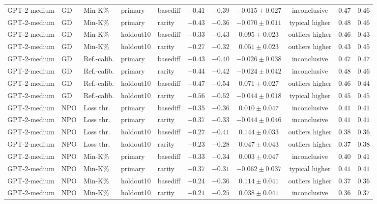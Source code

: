 {\begin{longtable}{@{\extracolsep{\fill}}lllllcccccc@{}}
GPT-2-medium & GD & Min-K\% & primary & basediff & $-0.41$ & $-0.39$ & $-0.015 \pm 0.027$ & inconclusive & $0.47$ & $0.46$ \\
GPT-2-medium & GD & Min-K\% & primary & rarity & $-0.43$ & $-0.36$ & $-0.070 \pm 0.011$ & typical higher & $0.48$ & $0.46$ \\
GPT-2-medium & GD & Min-K\% & holdout10 & basediff & $-0.33$ & $-0.43$ & $0.095 \pm 0.023$ & outliers higher & $0.46$ & $0.43$ \\
GPT-2-medium & GD & Min-K\% & holdout10 & rarity & $-0.27$ & $-0.32$ & $0.051 \pm 0.023$ & outliers higher & $0.43$ & $0.45$ \\
GPT-2-medium & GD & Ref.-calib. & primary & basediff & $-0.43$ & $-0.40$ & $-0.026 \pm 0.038$ & inconclusive & $0.47$ & $0.47$ \\
GPT-2-medium & GD & Ref.-calib. & primary & rarity & $-0.44$ & $-0.42$ & $-0.024 \pm 0.042$ & inconclusive & $0.48$ & $0.46$ \\
GPT-2-medium & GD & Ref.-calib. & holdout10 & basediff & $-0.47$ & $-0.54$ & $0.071 \pm 0.027$ & outliers higher & $0.46$ & $0.44$ \\
GPT-2-medium & GD & Ref.-calib. & holdout10 & rarity & $-0.56$ & $-0.52$ & $-0.044 \pm 0.018$ & typical higher & $0.45$ & $0.45$ \\
GPT-2-medium & NPO & Loss thr. & primary & basediff & $-0.35$ & $-0.36$ & $0.010 \pm 0.047$ & inconclusive & $0.41$ & $0.41$ \\
GPT-2-medium & NPO & Loss thr. & primary & rarity & $-0.37$ & $-0.33$ & $-0.044 \pm 0.046$ & inconclusive & $0.41$ & $0.41$ \\
GPT-2-medium & NPO & Loss thr. & holdout10 & basediff & $-0.27$ & $-0.41$ & $0.144 \pm 0.033$ & outliers higher & $0.38$ & $0.36$ \\
GPT-2-medium & NPO & Loss thr. & holdout10 & rarity & $-0.23$ & $-0.28$ & $0.047 \pm 0.043$ & outliers higher & $0.37$ & $0.38$ \\
GPT-2-medium & NPO & Min-K\% & primary & basediff & $-0.33$ & $-0.34$ & $0.003 \pm 0.047$ & inconclusive & $0.40$ & $0.41$ \\
GPT-2-medium & NPO & Min-K\% & primary & rarity & $-0.37$ & $-0.31$ & $-0.062 \pm 0.037$ & typical higher & $0.41$ & $0.41$ \\
GPT-2-medium & NPO & Min-K\% & holdout10 & basediff & $-0.24$ & $-0.36$ & $0.114 \pm 0.041$ & outliers higher & $0.37$ & $0.36$ \\
GPT-2-medium & NPO & Min-K\% & holdout10 & rarity & $-0.21$ & $-0.25$ & $0.038 \pm 0.041$ & inconclusive & $0.36$ & $0.37$ \\

\end{longtable}}
